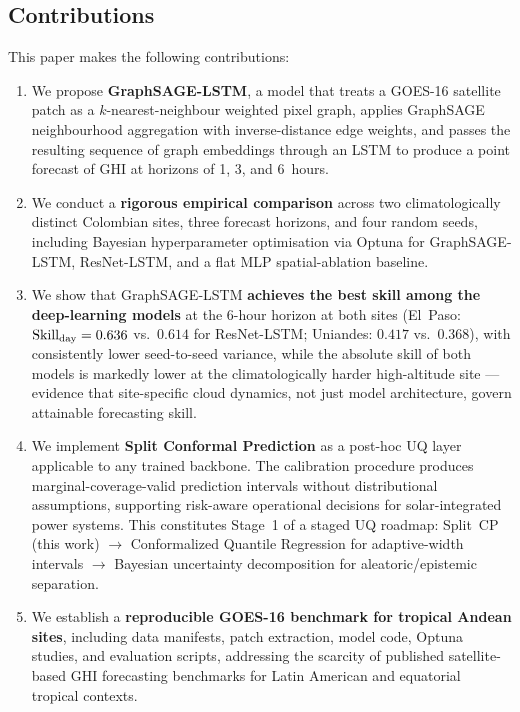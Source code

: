 \subsection*{Contributions}

This paper makes the following contributions:

\begin{enumerate}
  \item We propose \textbf{GraphSAGE-LSTM}, a model that treats a GOES-16 satellite
        patch as a $k$-nearest-neighbour weighted pixel graph, applies GraphSAGE
        neighbourhood aggregation \cite{hamilton2017} with inverse-distance edge
        weights, and passes the resulting sequence of graph embeddings through an
        LSTM to produce a point forecast of GHI at horizons of 1, 3, and 6~hours.

  \item We conduct a \textbf{rigorous empirical comparison} across two climatologically
        distinct Colombian sites, three forecast horizons, and four random seeds,
        including Bayesian hyperparameter optimisation via Optuna \cite{akiba2019}
        for GraphSAGE-LSTM, ResNet-LSTM, and a flat MLP spatial-ablation baseline.

  \item We show that GraphSAGE-LSTM \textbf{achieves the best skill among the
        deep-learning models} at the 6-hour horizon at both sites
        (El~Paso: $\text{Skill}_\text{day} = 0.636$ vs.\ $0.614$ for ResNet-LSTM; Uniandes:
        $0.417$ vs.\ $0.368$), with consistently lower seed-to-seed variance,
        while the absolute skill of both models is markedly lower at the
        climatologically harder high-altitude site --- evidence that
        site-specific cloud dynamics, not just model architecture, govern
        attainable forecasting skill.

  \item We implement \textbf{Split Conformal Prediction} \cite{vovk2005,angelopoulos2023}
        as a post-hoc UQ layer applicable to any trained backbone.
        The calibration procedure produces marginal-coverage-valid prediction
        intervals without distributional assumptions, supporting risk-aware
        operational decisions for solar-integrated power systems. This
        constitutes Stage~1 of a staged UQ roadmap: Split~CP (this work)
        $\to$ Conformalized Quantile Regression \cite{romano2019} for
        adaptive-width intervals $\to$ Bayesian uncertainty decomposition
        \cite{kendall2017} for aleatoric/epistemic separation.

  \item We establish a \textbf{reproducible GOES-16 benchmark for tropical
        Andean sites}, including data manifests, patch extraction, model code,
        Optuna studies, and evaluation scripts, addressing the scarcity of
        published satellite-based GHI forecasting benchmarks for Latin American
        and equatorial tropical contexts.
\end{enumerate}

